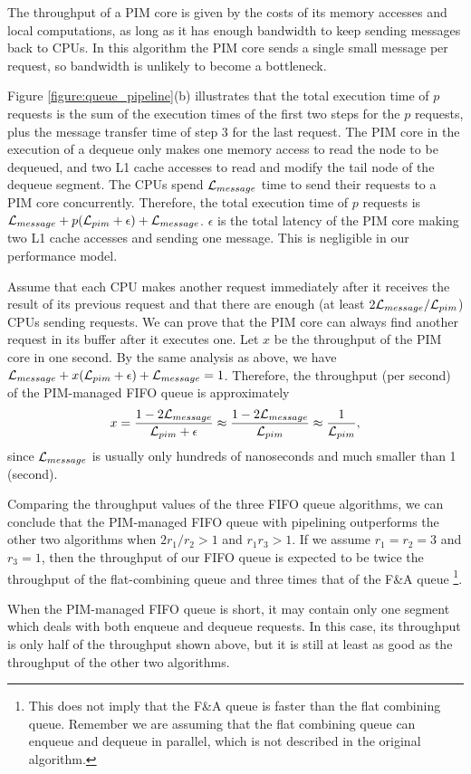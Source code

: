 The throughput of a PIM core is given by the costs of its memory accesses and local computations, 
as long as it has enough bandwidth to keep sending messages back to CPUs.  
In this algorithm the PIM core sends a single small message per request, so bandwidth is unlikely to 
become a bottleneck. 

Figure \ref{figure:queue_pipeline}(b) illustrates that 
the total execution time of $p$ requests is the sum of the execution times of the first two steps 
for the $p$ requests, plus the message transfer time of step 3 for the last request.   
The PIM core in the execution of a dequeue only makes one memory access to read the node 
to be dequeued, and two L1 cache accesses to read and modify the tail node of the dequeue segment.   
The CPUs spend $\mathcal{L}_{message}$ time to send their requests to a PIM core concurrently. 
Therefore, the total execution time of $p$ requests 
is $\mathcal{L}_{message} + p(\mathcal{L}_{pim} + \epsilon) + \mathcal{L}_{message}$. $\epsilon$ 
is the total latency of the PIM core making two L1 cache accesses and sending one message. 
This is negligible in our performance model. 

Assume that each CPU makes another request immediately after it receives the result of its previous request 
and that there are enough (at least $2\mathcal{L}_{message} / \mathcal{L}_{pim}$) CPUs sending requests.
We can prove that the PIM core can always find another request in its buffer after it executes one. 
Let $x$ be the throughput of the PIM core in one second.
By the same analysis as above, we have $\mathcal{L}_{message} + x(\mathcal{L}_{pim} + \epsilon) + \mathcal{L}_{message} = 1$. 
Therefore, the throughput (per second) of the PIM-managed FIFO queue is approximately 
$$x = {1 - 2\mathcal{L}_{message} \over \mathcal{L}_{pim} + \epsilon} \approx {1 - 2\mathcal{L}_{message}\over \mathcal{L}_{pim}} 
\approx {1 \over \mathcal{L}_{pim}},$$
since $\mathcal{L}_{message}$ is usually only hundreds of nanoseconds and much smaller than 1 (second). 

Comparing the throughput values of the three FIFO queue algorithms, 
we can conclude that the PIM-managed FIFO queue with pipelining outperforms the other two algorithms 
when $2r_1 / r_2 > 1$ and $r_1 r_3 > 1$. 
If we assume $r_1 = r_2 = 3$ and $r_3 = 1$, then the throughput of our FIFO queue is expected to be 
twice the throughput of the flat-combining queue and three times that of the F\&A queue 
\footnote{This does not imply that the F\&A queue is faster than the flat combining queue. Remember we 
are assuming that the flat combining queue can enqueue and dequeue in parallel, which is not described 
in the original algorithm.}.

When the PIM-managed FIFO queue is short, it may contain only one segment 
which deals with both enqueue and dequeue requests. 
In this case, its throughput is only half of the throughput shown above, 
but it is still at least as good as the throughput of the other two algorithms. 

